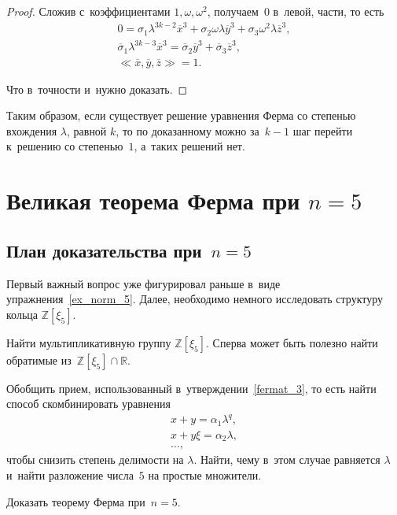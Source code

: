 \documentclass{article}
\begin{document}
\begin{proof}
  Сложив с~коэффициентами $1, \omega, \omega^2$, получаем~$0$ в~левой, части,
  то есть
  \begin{gather*}
    0 = \sigma_1 \lambda^{3k-2} \overline{x}^3 +
        \sigma_2 \omega \lambda \overline{y}^3 +
        \sigma_3 \omega^2 \lambda \overline{z}^3,\\
    \overline \sigma_1 \lambda^{3k-3} \overline{x}^3 =
        \overline \sigma_2 \overline{y}^3 +
        \overline \sigma_3 \overline{z}^3,\\
    \ll\!\overline{x}, \overline{y}, \overline{z}\!\gg = 1.
  \end{gather*}

  Что в~точности и~нужно доказать.
\end{proof}

Таким образом, если существует решение уравнения Ферма со степенью вхождения
$\lambda$, равной $k$, то по доказанному можно за~$k-1$ шаг перейти к~решению со
степенью~$1$, а~таких решений нет.

\section{Великая теорема Ферма при $n = 5$}

\subsection{План доказательства при~$n = 5$}

Первый важный вопрос уже фигурировал раньше в~виде упражнения~\ref{ex_norm_5}.
Далее, необходимо немного исследовать структуру кольца $\mathbb{Z}[\xi_5]$.

\begin{exercise}[сложное]
  Найти мультипликативную группу $\mathbb{Z}[\xi_5]$.
  Сперва может быть полезно найти обратимые
  из~$\mathbb{Z}[\xi_5] \cap \mathbb{R}$.
\end{exercise}

\begin{exercise}
  Обобщить прием, использованный в~утверждении~\ref{fermat_3}, то есть найти
  способ скомбинировать уравнения
  \begin{gather*}
    x + y = \alpha_1 \lambda^{q},\\
    x + y \xi = \alpha_2 \lambda,\\
    \ldots,
  \end{gather*}
  чтобы снизить степень делимости на $\lambda$. Найти, чему в~этом случае
  равняется $\lambda$ и~найти разложение числа~$5$ на простые множители.
\end{exercise}

\begin{exercise}
  Доказать теорему Ферма при~$n = 5$.
\end{exercise}
\end{document}
